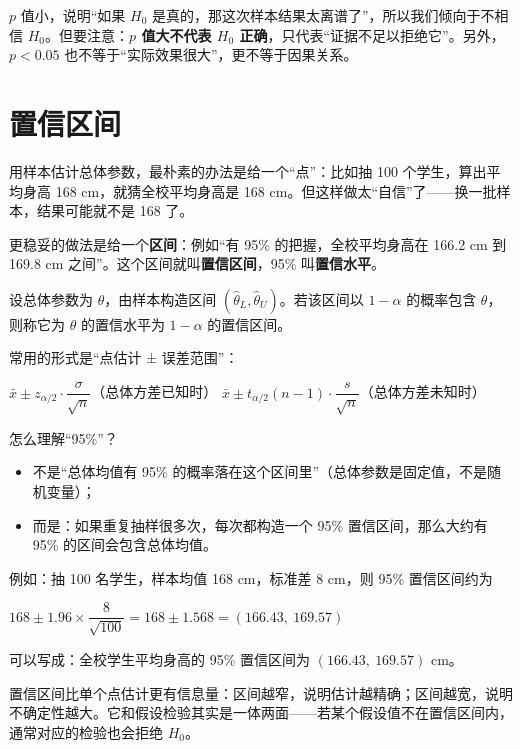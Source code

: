 \documentclass[lang=cn,10pt]{elegantbook}
\begin{document}
\begin{remark}
$p$ 值小，说明“如果 $H_0$ 是真的，那这次样本结果太离谱了”，所以我们倾向于不相信 $H_0$。但要注意：\textbf{$p$ 值大不代表 $H_0$ 正确}，只代表“证据不足以拒绝它”。另外，$p<0.05$ 也不等于“实际效果很大”，更不等于因果关系。
\end{remark}



\section{置信区间}
用样本估计总体参数，最朴素的办法是给一个“点”：比如抽 100 个学生，算出平均身高 168 cm，就猜全校平均身高是 168 cm。但这样做太“自信”了——换一批样本，结果可能就不是 168 了。

更稳妥的做法是给一个\textbf{区间}：例如“有 95\% 的把握，全校平均身高在 166.2 cm 到 169.8 cm 之间”。这个区间就叫\textbf{置信区间}，95\% 叫\textbf{置信水平}。

\begin{definition}[置信区间]
设总体参数为 $\theta$，由样本构造区间 $(\hat{\theta}_L,\hat{\theta}_U)$。若该区间以 $1-\alpha$ 的概率包含 $\theta$，则称它为 $\theta$ 的置信水平为 $1-\alpha$ 的置信区间。
\end{definition}

常用的形式是“点估计 ± 误差范围”：
\begin{center}
$\bar{x}\pm z_{\alpha/2}\cdot\dfrac{\sigma}{\sqrt{n}}$（总体方差已知时）\qquad
$\bar{x}\pm t_{\alpha/2}(n-1)\cdot\dfrac{s}{\sqrt{n}}$（总体方差未知时）
\end{center}

怎么理解“95\%”？
\begin{itemize}
  \item 不是“总体均值有 95\% 的概率落在这个区间里”（总体参数是固定值，不是随机变量）；
  \item 而是：如果重复抽样很多次，每次都构造一个 95\% 置信区间，那么大约有 95\% 的区间会包含总体均值。
\end{itemize}

例如：抽 100 名学生，样本均值 168 cm，标准差 8 cm，则 95\% 置信区间约为
\begin{center}
$168\pm 1.96\times\dfrac{8}{\sqrt{100}}=168\pm1.568=(166.43,\ 169.57)$
\end{center}
可以写成：全校学生平均身高的 95\% 置信区间为 $(166.43,\ 169.57)$ cm。

\begin{remark}
置信区间比单个点估计更有信息量：区间越窄，说明估计越精确；区间越宽，说明不确定性越大。它和假设检验其实是一体两面——若某个假设值不在置信区间内，通常对应的检验也会拒绝 $H_0$。
\end{remark}
\end{document}
